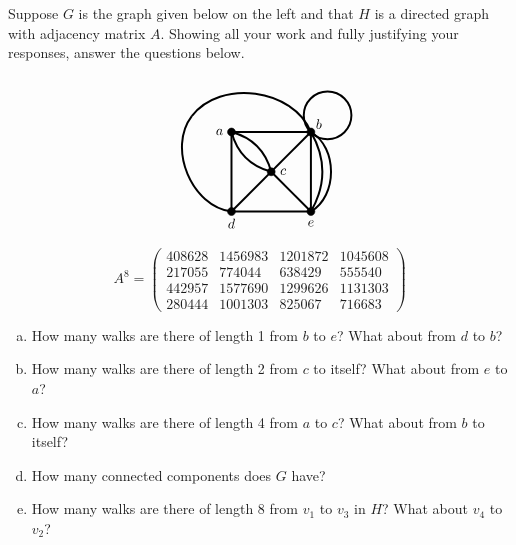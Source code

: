 \documentclass[11pt,letterpaper]{article}
\begin{document}
 Suppose $G$ is the graph given below on the left and that $H$ is a directed graph with adjacency matrix $A$. Showing all your work and fully justifying your responses, answer the questions below. \par
	\begin{minipage}[c]{0.49\textwidth}
	\[
	\begin{tikzpicture}[scale=2]
	\draw[line width=0.05cm] (0,0) to (1,0);
	\draw[line width=0.05cm] (0,0) to (0,1);
	\draw[line width=0.05cm] (0,1) to (1,1);
	\draw[line width=0.05cm] (1,0) to (1,1);
	\draw[line width=0.05cm] (0,0) to (1,1);
	\draw[line width=0.05cm] (0.5,0.5) to (1,0);
	\draw[line width=0.05cm, bend right= 30] (0,1) to (0.5,0.5);
	\draw[line width=0.05cm, bend left= 30] (0,1) to (0.5,0.5);
	\draw[line width=0.05cm, bend right= 30] (1,0) to (1,1);
	\draw[line width=0.05cm, bend right= 60] (1,0) to (1,1);
	\draw[line width=0.05cm, bend left= 60] (0,0) to (-0.5,1.2);
	\draw[line width=0.05cm, bend right= 60] (1,1) to (-0.5,1.2);
	\draw[line width=0.05cm] (1.21,1.21) circle (0.3);
	
	\draw[fill= black] (0,0) circle (0.05);
	\draw[fill= black] (1,0) circle (0.05);
	\draw[fill= black] (1,1) circle (0.05);
	\draw[fill= black] (0,1) circle (0.05);
	\draw[fill= black] (0.5,0.5) circle (0.05);
	
	\node at (-0.15,1) {$a$};
	\node at (1.10,1.10) {$b$};
	\node at (0.65,0.50) {$c$};
	\node at (0,-0.15) {$d$};
	\node at (1,-0.15) {$e$};
	\end{tikzpicture}
	\]
	\end{minipage}%
	\begin{minipage}[c]{0.49\textwidth}
	\[
	A^8= 
	\begin{pmatrix}
	408 628 & 1456983 & 1201872 & 1045608 \\
	217055 & 774044 & 638429 & 555540 \\
	442957 & 1577690 & 1299626 & 1131303 \\
	280444 & 1001303 & 825067 & 716683
	\end{pmatrix}
	\]
	\end{minipage}

\begin{enumerate}[(a)]
\item How many walks are there of length 1 from $b$ to $e$? What about from $d$ to $b$?
\item How many walks are there of length 2 from $c$ to itself? What about from $e$ to $a$?
\item How many walks are there of length 4 from $a$ to $c$? What about from $b$ to itself?
\item How many connected components does $G$ have?
\item How many walks are there of length 8 from $v_1$ to $v_3$ in $H$? What about $v_4$ to $v_2$?
\end{enumerate} \pspace
\end{document}
